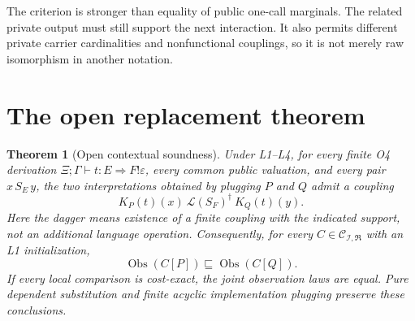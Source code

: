 \documentclass[11pt,a4paper]{article}
\newtheorem{theorem}{Theorem}[section]
\theoremstyle{definition}
\newcommand{\Obs}{\operatorname{Obs}}
\begin{document}
The criterion is stronger than equality of public one-call marginals.
The related private output must still support the next interaction. It
also permits different private carrier cardinalities and nonfunctional
couplings, so it is not merely raw isomorphism in another notation.

\section{The open replacement theorem}\label{sec:replacement}

\begin{theorem}[Open contextual soundness]\label{thm:replacement}
Under L1--L4, for every finite O4 derivation
$\Xi;\Gamma\vdash t:E\Rightarrow F!\varepsilon$, every common public
valuation, and every pair $x\,S_E\,y$, the two interpretations obtained
by plugging $P$ and $Q$ admit a coupling
\[
 K_P(t)(x)\ \mathcal L(S_F)^\dagger\ K_Q(t)(y).
\]
Here the dagger means existence of a finite coupling with the indicated
support, not an additional language operation. Consequently, for every
$C\in\mathcal C_{\mathcal I,\mathfrak R}$ with an L1 initialization,
\begin{equation}\label{eq:replacement}
 \Obs(C[P])\sqsubseteq\Obs(C[Q]).
\end{equation}
If every local comparison is cost-exact, the joint observation laws are
equal. Pure dependent substitution and finite acyclic implementation
plugging preserve these conclusions.
\end{theorem}
\end{document}
